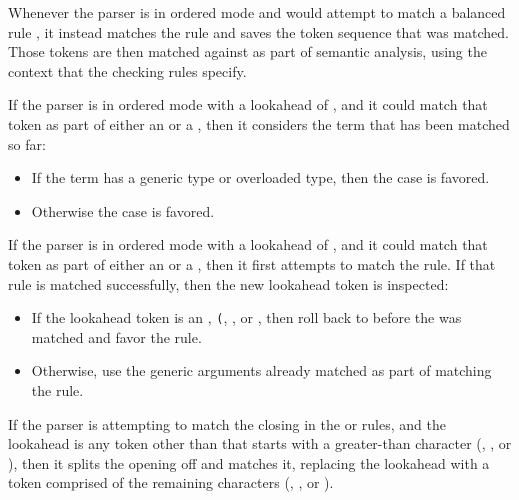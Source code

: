 Whenever the parser is in ordered mode and would attempt to match a balanced rule , it instead matches the  rule and saves the token sequence that was matched.
Those tokens are then matched against  as part of semantic analysis, using the context that the checking rules specify.




If the parser is in ordered mode with a lookahead of \code{<}, and it could match that token as part of either an  or a , then it considers the term that has been matched so far:

\begin{itemize}
\item If the term has a generic type or overloaded type, then the  case is favored.
\item Otherwise the  case is favored.
\end{itemize}


If the parser is in ordered mode with a lookahead of \code{<}, and it could match that token as part of either an  or a , then it first attempts to match the  rule. If that rule is matched successfully, then the new lookahead token is inspected:

\begin{itemize}
\item If the lookahead token is an , \lstinline|(|, , or , then roll back to before the \code{<} was matched and favor the  rule.
\item Otherwise, use the generic arguments already matched as part of matching the  rule.
\end{itemize}


If the parser is attempting to match the closing \code{>} in the  or  rules, and the lookahead is any token other than \code{>} that starts with a greater-than character (\code{>=}, \code{>>}, or \code{>>=}), then it splits the opening \code{>} off and matches it, replacing the lookahead with a token comprised of the remaining characters (\code{=}, \code{>}, or \code{>=}).

